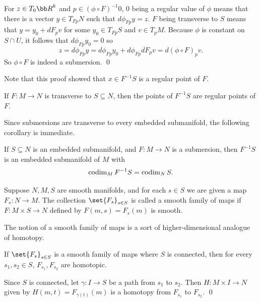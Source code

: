     For $z\in T_0\bR^k$ and $p\in(\phi\circ F)^{-1}0$, $0$ being a regular value of $\phi$ means that there is a vector
    $y\in T_{Fp}N$ such that $d\phi_{Fp}y=z$.
    $F$ being transverse to $S$ means that $y=y_0+dF_pv$ for some $y_0\in T_{Fp}S$ and $v\in T_pM$.
    Because $\phi$ is constant on $S\cap U$, it follows that $d\phi_{Fp}y_0=0$ so
    $$ z = d\phi_{Fp}y = d\phi_{Fp}y_0 + d\phi_{Fp}dF_pv = d(\phi\circ F)_pv . $$
    So $\phi\circ F$ is indeed a submersion.
    \qed

\eproof

Note that this proof showed that $x\in F^{-1}S$ is a regular point of $F$.

\bprop

    If $F\colon M\to N$ is transverse to $S\subseteq N$, then the points of $F^{-1}S$ are regular points of $F$.

\eprop

Since submersions are transverse to every embedded submanifold, the following corollary is immediate.

\bcoro

    If $S\subseteq N$ is an embedded submanifold, and $F\colon M\to N$ is a submersion, then $F^{-1}S$ is an embedded submanifold
    of $M$ with
    $$ \mathop{\rm codim}\nolimits_MF^{-1}S = \mathop{\rm codim}\nolimits_NS . $$

\ecoro

\bdefn

    Suppose $N,M,S$ are smooth manifolds, and for each $s\in S$ we are given a map $F_s\colon N\to M$.
    The collection $\set{F_s}_{s\in S}$ is called a {\emphcolor smooth family of maps} if $F\colon M\times S\to N$
    defined by $F(m,s)=F_s(m)$ is smooth.

\edefn

The notion of a smooth family of maps is a sort of higher-dimensional analogue of homotopy.

\bprop

    If $\set{F_s}_{s\in S}$ is a smooth family of maps where $S$ is connected, then for every $s_1,s_2\in S$, $F_{s_1},F_{s_2}$
    are homotopic.

\eprop

\bproof

    Since $S$ is connected, let $\gamma\colon I\to S$ be a path from $s_1$ to $s_2$.
    Then $H\colon M\times I\to N$ given by $H(m,t)=F_{\gamma(t)}(m)$ is a homotopy from $F_{s_1}$ to $F_{s_2}$.
    \qed

\eproof

\blemm

